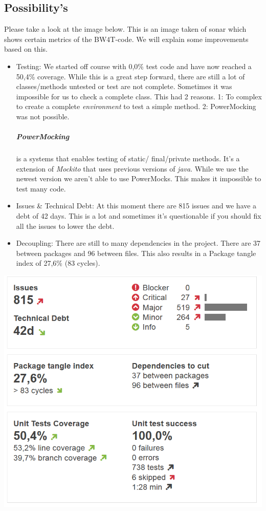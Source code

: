 \documentclass{article}
\begin{document}
\subsection*{Possibility's}
Please take a look at the image below. This is an image taken of sonar which shows certain metrics of the BW4T-code. We will explain some improvements based on this. 
\begin{itemize}
	\item Testing: We started off course with 0,0\% test code and have now reached a 50,4\% coverage. While this is a great step forward, there are still a lot of classes/methods untested or test are not complete. Sometimes it was impossible for us to check a complete class. This had 2 reasons. 1: To complex to create a complete \emph{environment} to test a simple method. 2: PowerMocking was not possible.

\subparagraph*{PowerMocking}is a systems that enables testing of static/ final/private methods. It's a extension of \emph{Mockito} that uses previous versions of \emph{java}. While we use the newest version we aren't able to use PowerMocks. This makes it impossible to test many code. 

	\item Issues \& Technical Debt: At this moment there are 815 issues and we have a debt of 42 days. This is a lot and sometimes it's questionable if you should fix all the issues to lower the debt. 
	
	\item Decoupling: There are still to many dependencies in the project. There are 37 between packages and 96 between files. This also results in a Package tangle index of	27,6\%  (83 cycles).  
	
\end{itemize}
\includegraphics[scale=0.5]{statistics_group1}
	
\end{document}
